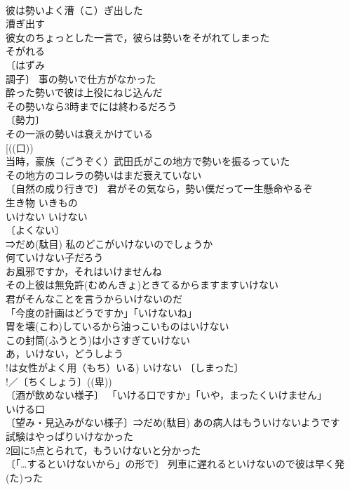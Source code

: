 \documentclass[8pt]{extreport}
\begin{document}
\begin{CJK}{UTF8}{min}
\\	彼は勢いよく漕（こ）ぎ出した 
\\	漕ぎ出す　
\\	彼女のちょっとした一言で，彼らは勢いをそがれてしまった 
\\	そがれる　 
\\	〔はずみ　
\\	調子〕 事の勢いで仕方がなかった 
\\	酔った勢いで彼は上役にねじ込んだ 
\\	その勢いなら3時までには終わるだろう 
\\	〔勢力〕
\\	その一派の勢いは衰えかけている 
\\	[((口))
\\	当時，豪族（ごうぞく）武田氏がこの地方で勢いを振るっていた 
\\	その地方のコレラの勢いはまだ衰えていない 
\\	〔自然の成り行きで〕 君がその気なら，勢い僕だって一生懸命やるぞ 
\\	生き物	いきもの	
\\	いけない	いけない	
\\	〔よくない〕
\\	⇒だめ(駄目) 私のどこがいけないのでしょうか 
\\	何ていけない子だろう 
\\	お風邪ですか，それはいけませんね 
\\	その上彼は無免許(むめんきょ)ときてるからますますいけない 
\\	君がそんなことを言うからいけないのだ 
\\	「今度の計画はどうですか」「いけないね」 
\\	胃を壊(こわ)しているから油っこいものはいけない 
\\	この封筒(ふうとう)は小さすぎていけない 
\\	あ，いけない，どうしよう 
\\	!は女性がよく用（もち）いる) いけない 〔しまった〕
\\	!／〔ちくしょう〕((卑)) 
\\	〔酒が飲めない様子〕 「いける口ですか」「いや，まったくいけません」 
\\	いける口　
\\	〔望み・見込みがない様子〕⇒だめ(駄目) あの病人はもういけないようです 
\\	試験はやっぱりいけなかった 
\\	2回に5点とられて，もういけないと分かった 
\\	〔「…するといけないから」の形で〕 列車に遅れるといけないので彼は早く発(た)った 

\end{CJK}
\end{document}
